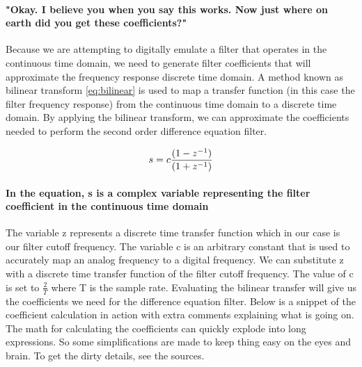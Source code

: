 \documentclass[acmlarge,screen]{acmart}
\begin{document}
	\paragraph{"Okay. I believe you when you say this works. Now just where on earth did you get these coefficients?"} Because we are attempting to digitally emulate a filter that operates in the continuous time domain, we need to generate filter coefficients that will approximate the frequency response discrete time domain. A method known as bilinear transform \eqref{eq:bilinear} is used to map a transfer function (in this case the filter frequency response) from the continuous time domain to a discrete time domain. By applying the bilinear transform, we can approximate the coefficients needed to perform the second order difference equation filter.\cite{stanford_2007}
	
	\begin{equation}
		\large
		s=c\frac{(1-z^{-1})}{(1+z^{-1})}
		\label{eq:bilinear}
	\end{equation}
	
	\paragraph{In the equation, s is a complex variable representing the filter coefficient in the continuous time domain} The variable z represents a discrete time transfer function which in our case is our filter cutoff frequency. The variable c is an arbitrary constant that is used to accurately map an analog frequency to a digital frequency. We can substitute z with a discrete time transfer function of the  filter cutoff frequency. The value of c is set to \( \frac{2}{T} \) where T is the sample rate. Evaluating the bilinear transfer will give us the coefficients we need for the difference equation filter. Below is a snippet of the coefficient calculation in action with extra comments explaining what is going on. The math for calculating the coefficients can quickly explode into long expressions. So some simplifications are made to keep thing easy on the eyes and brain. To get the dirty details, see the sources.
	
\end{document}
